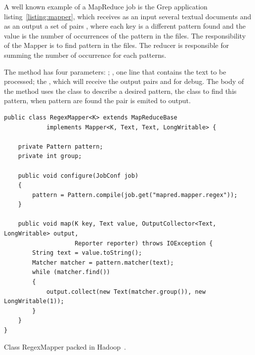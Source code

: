 A well known example of a MapReduce job is the Grep application listing~\ref{listing:mapper},
which receives as an input several textual documents and as an output a set of pairs
, where each key is a different pattern found and the value is the
number of occurrences of the pattern in the files. The responsibility of the Mapper
is to find pattern in the files. The reducer is responsible for summing the number
of occurrence for each patterns.

The  method has four parameters: ; ,
one line that contains the text to be processed; the , which will receive
the output pairs and  for debug. The body of the method uses the class
 to describe a desired pattern, the class  to find this
pattern, when pattern are found the pair  is emited to
output.

\singlespacing
\begin{listing}[H]
\begin{verbatim}
public class RegexMapper<K> extends MapReduceBase
			implements Mapper<K, Text, Text, LongWritable> {

    private Pattern pattern;
    private int group;

    public void configure(JobConf job)
    {
        pattern = Pattern.compile(job.get("mapred.mapper.regex"));
    }

    public void map(K key, Text value, OutputCollector<Text, LongWritable> output,
					Reporter reporter) throws IOException {
        String text = value.toString();
        Matcher matcher = pattern.matcher(text);
        while (matcher.find())
        {
            output.collect(new Text(matcher.group()), new LongWritable(1));
        }
    }
}
\end{verbatim}
\caption{Class RegexMapper packed in Hadoop~\cite{hadoop}.} 
\label{listing:mapper}
\end{listing}


